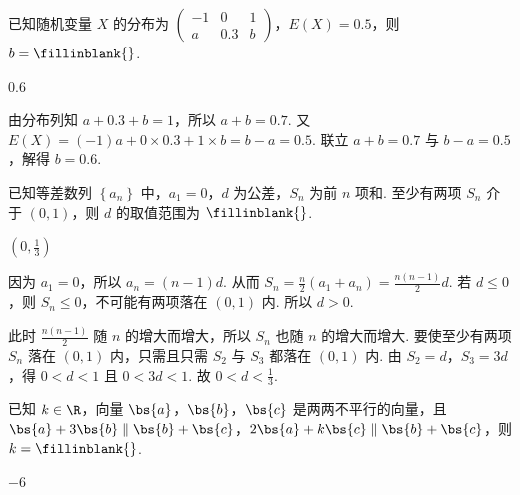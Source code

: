 \documentclass[UTF8,a4paper,oneside,11pt]{ctexbook}
\begin{document}
\begin{problem}
已知随机变量 \(X\) 的分布为 \( \left( \begin{smallmatrix} -1 & 0 & 1 \\ a & 0.3 & b \end{smallmatrix} \right) \)，\( E\left( X \right)=0.5 \)，则 \( b=\fillinblank{} \).
\end{problem}

\begin{answer}
\(0.6\)
\end{answer}

\begin{solution}
由分布列知 \( a+0.3+b=1 \)，所以 \( a+b=0.7 \). 又 \( E\left( X \right)=\left( -1 \right)a+0\times 0.3+1\times b=b-a=0.5 \). 联立 \( a+b=0.7 \) 与 \( b-a=0.5 \)，解得 \( b=0.6 \).
\end{solution}

\begin{problem}
已知等差数列 \( \left\{ a_n \right\} \) 中，\( a_1=0 \)，\( d \) 为公差，\( S_n \) 为前 \( n \) 项和. 至少有两项 \( S_n \) 介于 \( \left( 0,1 \right) \)，则 \( d \) 的取值范围为 \(\fillinblank{} \).
\end{problem}

\begin{answer}
\(\left( 0,\frac{1}{3} \right)\)
\end{answer}

\begin{solution}
因为 \( a_1=0 \)，所以 \( a_n=\left( n-1 \right)d \). 从而 \( S_n=\frac{n}{2}\left( a_1+a_n \right)=\frac{n\left( n-1 \right)}{2}d \).
若 \( d\le 0 \)，则 \( S_n\le 0 \)，不可能有两项落在 \( \left( 0,1 \right) \) 内. 所以 \( d>0 \).

此时 \( \frac{n\left( n-1 \right)}{2} \) 随 \( n \) 的增大而增大，所以 \( S_n \) 也随 \( n \) 的增大而增大. 要使至少有两项 \( S_n \) 落在 \( \left( 0,1 \right) \) 内，只需且只需 \(S_2\) 与 \(S_3\) 都落在 \( \left( 0,1 \right) \) 内.
由 \( S_2=d \)，\( S_3=3d \)，得 \( 0<d<1 \) 且 \( 0<3d<1 \). 故 \( 0<d<\frac{1}{3} \).
\end{solution}

\begin{problem}
已知 \( k\in \R \)，向量 \( \bs{a} \)，\( \bs{b} \)，\( \bs{c} \) 是两两不平行的向量，且 \( \bs{a}+3\bs{b}\parallel \bs{b}+\bs{c} \)，\( 2\bs{a}+k\bs{c}\parallel \bs{b}+\bs{c} \)，则 \( k=\fillinblank{} \).
\end{problem}

\begin{answer}
\(-6\)
\end{answer}
\end{document}
